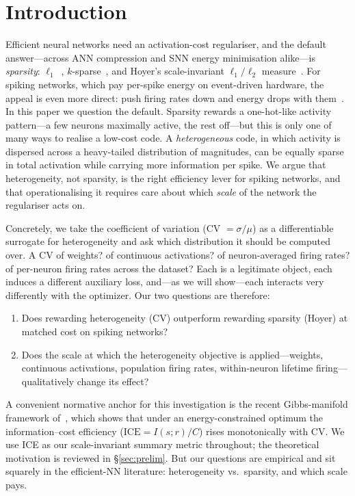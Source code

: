 \documentclass{article}
\begin{document}
\section{Introduction}
\label{sec:intro}

Efficient neural networks need an activation-cost regulariser, and the default answer---across ANN compression and SNN energy minimisation alike---is \emph{sparsity}: $\ell_1$~\cite{olshausen1996sparse}, $k$-sparse~\cite{makhzani2014}, and Hoyer's scale-invariant $\ell_1/\ell_2$ measure~\cite{yang2020deephoyer}. For spiking networks, which pay per-spike energy on event-driven hardware, the appeal is even more direct: push firing rates down and energy drops with them~\cite{pellegrini2021low,kim2022exploring,narduzzi2022optimizing}. In this paper we question the default. Sparsity rewards a one-hot-like activity pattern---a few neurons maximally active, the rest off---but this is only one of many ways to realise a low-cost code. A \emph{heterogeneous} code, in which activity is dispersed across a heavy-tailed distribution of magnitudes, can be equally sparse in total activation while carrying more information per spike. We argue that heterogeneity, not sparsity, is the right efficiency lever for spiking networks, and that operationalising it requires care about which \emph{scale} of the network the regulariser acts on.

Concretely, we take the coefficient of variation (CV $= \sigma/\mu$) as a differentiable surrogate for heterogeneity and ask which distribution it should be computed over. A CV of weights? of continuous activations? of neuron-averaged firing rates? of per-neuron firing rates across the dataset? Each is a legitimate object, each induces a different auxiliary loss, and---as we will show---each interacts very differently with the optimizer. Our two questions are therefore:
\begin{enumerate}\itemsep0pt
\item[\textbf{Q1.}] Does rewarding heterogeneity (CV) outperform rewarding sparsity (Hoyer) at matched cost on spiking networks?
\item[\textbf{Q2.}] Does the scale at which the heterogeneity objective is applied---weights, continuous activations, population firing rates, within-neuron lifetime firing---qualitatively change its effect?
\end{enumerate}

A convenient normative anchor for this investigation is the recent Gibbs-manifold framework of~\cite{huang2025variability}, which shows that under an energy-constrained optimum the information--cost efficiency ($\mathrm{ICE} = I(s;r)/C$) rises monotonically with CV. We use ICE as our scale-invariant summary metric throughout; the theoretical motivation is reviewed in \S\ref{sec:prelim}. But our questions are empirical and sit squarely in the efficient-NN literature: heterogeneity vs.\ sparsity, and which scale pays.
\end{document}
